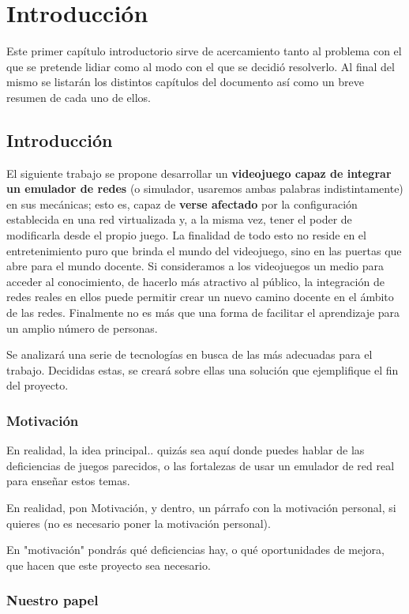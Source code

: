 \chapter{Introducción}\label{chap:Intro}
Este primer capítulo introductorio sirve de acercamiento tanto al problema con el que se pretende lidiar como al modo con el que se decidió resolverlo. Al final del mismo se listarán los distintos capítulos del documento así como un breve resumen de cada uno de ellos.

\section{Introducción}
El siguiente trabajo se propone desarrollar un \textbf{videojuego capaz de integrar un emulador de redes} (o simulador, usaremos ambas palabras indistintamente) en sus mecánicas; esto es, capaz de \textbf{verse afectado} por la configuración establecida en una red virtualizada y, a la misma vez, tener el poder de modificarla desde el propio juego. La finalidad de todo esto no reside en el entretenimiento puro que brinda el mundo del videojuego, sino en las puertas que abre para el mundo docente. Si consideramos a los videojuegos un medio para acceder al conocimiento, de hacerlo más atractivo al público, la integración de redes reales en ellos puede permitir crear un nuevo camino docente en el ámbito de las redes. Finalmente no es más que una forma de facilitar el aprendizaje para un amplio número de personas.

Se analizará una serie de tecnologías en busca de las más adecuadas para el trabajo. Decididas estas, se creará sobre ellas una solución que ejemplifique el fin del proyecto.

\subsection{Motivación}
En realidad, la idea principal.. quizás sea aquí donde puedes hablar de las deficiencias de juegos parecidos, o las fortalezas de usar un emulador de red real para enseñar estos temas.

En realidad, pon Motivación, y dentro, un párrafo con la motivación personal, si quieres (no es necesario poner la motivación personal).

En "motivación" pondrás qué deficiencias hay, o qué oportunidades de mejora, que hacen que este proyecto sea necesario.

\subsection{Nuestro papel}
 
